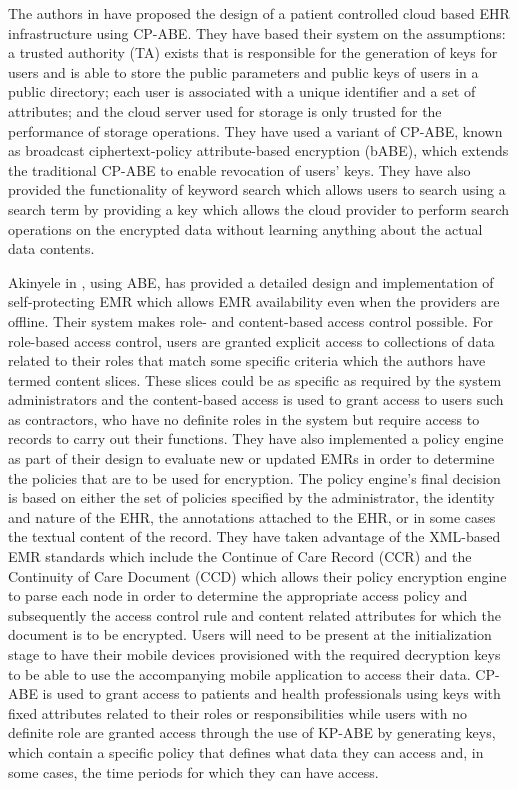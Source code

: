 The authors in \cite{Narayan2010} have proposed the design of a patient controlled cloud based EHR infrastructure using CP-ABE. They have based their system on the assumptions: a trusted authority (TA) exists that is responsible for the generation of keys for users and is able to store the public parameters and public keys of users in a public directory; each user is associated with a unique identifier and a set of attributes; and the cloud server used for storage is only trusted for the performance of storage operations. They have used a variant of CP-ABE, known as broadcast ciphertext-policy attribute-based encryption (bABE), which extends the traditional CP-ABE to enable revocation of users' keys. They have also provided the functionality of keyword search which allows users to search using a search term by providing a key which allows the cloud provider to perform search operations on the encrypted data without learning anything about the actual data contents.

Akinyele in \cite{Akinyele2010}, using ABE, has provided a detailed design and implementation of self-protecting EMR which allows EMR availability even when the providers are offline. Their system makes role- and content-based access control possible. For role-based access control, users are granted explicit access to collections of data related to their roles that match some specific criteria which the authors have termed content slices. These slices could be as specific as required by the system administrators and the content-based access is used to grant access to users such as contractors, who have no definite roles in the system but require access to records to carry out their functions. They have also implemented a policy engine as part of their design to evaluate new or updated EMRs in order to determine the policies that are to be used for encryption. The policy engine's final decision is based on either the set of policies specified by the administrator, the identity and nature of the EHR, the annotations attached to the EHR, or in some cases the textual content of the record. They have taken advantage of the XML-based EMR standards which include the Continue of Care Record (CCR) and the Continuity of Care Document (CCD) which allows their policy encryption engine to parse each node in order to determine the appropriate access policy and subsequently the access control rule and content related attributes for which the document is to be encrypted. Users will need to be present at the initialization stage to have their mobile devices provisioned with the required decryption keys to be able to use the accompanying mobile application to access their data. CP-ABE is used to grant access to patients and health professionals using keys with fixed attributes related to their roles or responsibilities while users with no definite role are granted access through the use of KP-ABE by generating keys, which contain a specific policy that defines what data they can access and, in some cases, the time periods for which they can have access.

